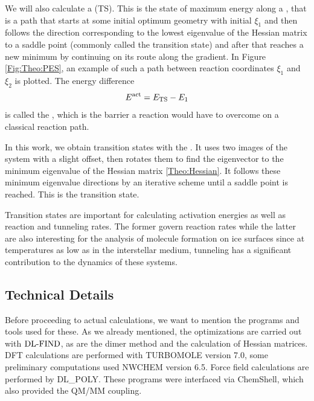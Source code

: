 We will also calculate a  (TS). This
is the state of maximum energy along a , that is a path that
starts at some initial optimum geometry with initial 
$\xi_1$ and then follows the direction corresponding to the lowest eigenvalue of
the Hessian matrix to a saddle point (commonly called the transition state) and
after that reaches a new minimum by continuing on its route along the gradient. In Figure
\ref{Fig:Theo:PES}, an example of such a path between reaction coordinates
$\xi_1$ and $\xi_{2}$ is plotted. The energy difference 
\begin{equation}
E^{\text{act}}=E_{\text{TS}} - E_1
\end{equation}
is called the , which is the barrier a reaction would
have to overcome on a classical reaction path.

In this work, we obtain transition states with the 
.\cite{HenkelmanJonsson1999} It uses two images of the system with a slight
offset, then rotates them to find the eigenvector to the minimum eigenvalue of the Hessian
matrix \eqref{Theo:Hessian}. It follows these minimum eigenvalue directions by an
iterative scheme until a saddle point is reached. This is the transition state.

Transition states are important for calculating activation energies as well as
reaction and tunneling rates. The former govern reaction rates while the latter
are also interesting for the analysis of molecule formation on ice surfaces since at
temperatures as low as in the interstellar medium, tunneling has a significant
contribution to the dynamics of these systems.

\subsection{Technical Details}

Before proceeding to actual calculations, we want to mention the programs and tools 
used for these. As we already mentioned, the optimizations are carried out with
$\text{DL-FIND}$, \cite{Kaestner2009} as are the dimer method and the calculation of 
Hessian matrices. DFT calculations are performed with
TURBOMOLE version 7.0,\cite{TURBOMOLE} some preliminary computations used
NWCHEM version 6.5.\cite{ValievBylaskaGovindEtAl2010} Force field calculations
are performed by DL\_POLY.\cite{TodorovSmithTrachenkoEtAl2006} These programs
were interfaced via ChemShell,\cite{chemshell,MetzKaestnerSokolEtAl2013} which
also provided the QM/MM coupling.

